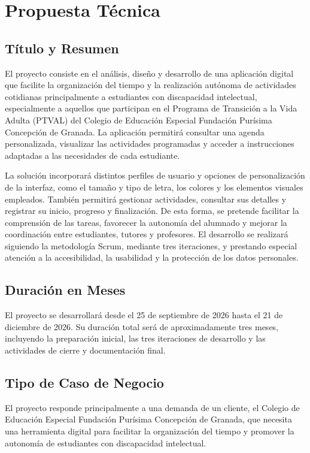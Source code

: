 \section{Propuesta Técnica}

\subsection{Título y Resumen}
El proyecto consiste en el análisis, diseño y desarrollo de una aplicación digital que facilite la organización del tiempo y la realización autónoma de actividades cotidianas principalmente a estudiantes con discapacidad intelectual, especialmente a aquellos que participan en el Programa de Transición a la Vida Adulta (PTVAL) del Colegio de Educación Especial Fundación Purísima Concepción de Granada. La aplicación permitirá consultar una agenda personalizada, visualizar las actividades programadas y acceder a instrucciones adaptadas a las necesidades de cada estudiante.

La solución incorporará distintos perfiles de usuario y opciones de personalización de la interfaz, como el tamaño y tipo de letra, los colores y los elementos visuales empleados. También permitirá gestionar actividades, consultar sus detalles y registrar su inicio, progreso y finalización. De esta forma, se pretende facilitar la comprensión de las tareas, favorecer la autonomía del alumnado y mejorar la coordinación entre estudiantes, tutores y profesores. El desarrollo se realizará siguiendo la metodología Scrum, mediante tres iteraciones, y prestando especial atención a la accesibilidad, la usabilidad y la protección de los datos personales.

\subsection{Duración en Meses}
El proyecto se desarrollará desde el 25 de septiembre de 2026 hasta el 21 de diciembre de 2026. Su duración total será de aproximadamente tres meses, incluyendo la preparación inicial, las tres iteraciones de desarrollo y las actividades de cierre y documentación final.

\subsection{Tipo de Caso de Negocio}
El proyecto responde principalmente a una demanda de un cliente, el Colegio de Educación Especial Fundación Purísima Concepción de Granada, que necesita una herramienta digital para facilitar la organización del tiempo y promover la autonomía de estudiantes con discapacidad intelectual.

